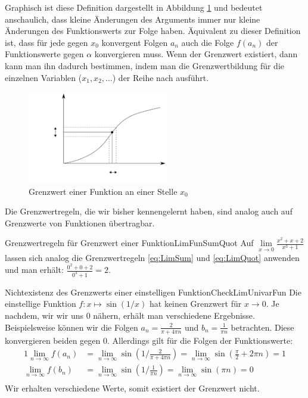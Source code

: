Graphisch ist diese Definition dargestellt in Abbildung \ref{fig:LimFun} und bedeutet anschaulich, dass kleine Änderungen des Arguments immer nur kleine Änderungen des Funktionswerts zur Folge haben. Äquivalent zu dieser Definition ist, dass für jede gegen $x_0$ konvergent Folgen $a_n$ auch die Folge $f(a_n)$ der Funktionswerte gegen $\alpha$ konvergieren muss. Wenn der Grenzwert existiert, dann kann man ihn dadurch bestimmen, indem man die Grenzwertbildung für die einzelnen Variablen ($x_1, x_2, \dots$) der Reihe nach ausführt.

\begin{figure}
    \centering
    \includegraphics[width=0.55\textwidth]{./svg/definition-convergence-point}
    \caption[Grenzwert einer Funktion]{Grenzwert einer Funktion an einer Stelle $x_0$}
    \label{fig:LimFun}
\end{figure}

Die Grenzwertregeln, die wir bisher kennengelernt haben, sind analog auch auf Grenzwerte von Funktionen übertragbar.

\begin{example}{Grenzwertregeln für Grenzwert einer Funktion}{LimFunSumQuot}
    Auf $\lim\limits_{x\to 0} \frac{x^2+x+2}{x^3+1}$ lassen sich analog die Grenzwertregeln \ref{eq:LimSum} und \ref{eq:LimQuot} anwenden und man erhält: $\frac{0^2+0+2}{0^3+1} = 2$.
\end{example}

\begin{example}{Nichtexistenz des Grenzwerts einer einstelligen Funktion}{CheckLimUnivarFun}
    Die einstellige Funktion $f: x \mapsto \sin(1/x)$ hat keinen Grenzwert für $x \to 0$. Je nachdem, wir wir uns $0$ nähern, erhält man verschiedene Ergebnisse. Beispielsweise können wir die Folgen $a_n = \frac{2}{\pi+4\pi n}$ und $b_n = \frac{1}{\pi n}$ betrachten. Diese konvergieren beiden gegen $0$. Allerdings gilt für die Folgen der Funktionswerte:
    \begin{alignat}{1}
       \lim\limits_{n\to\infty} f(a_n) &= \lim\limits_{n\to\infty} \sin\left(1 / \frac{2}{\pi+4\pi n}\right) = \lim\limits_{n\to\infty} \sin(\frac{\pi}{2} + 2\pi n) = 1 \\
       \lim\limits_{n\to\infty} f(b_n) &= \lim\limits_{n\to\infty} \sin\left(1 / \frac{1}{\pi n}\right) = \lim\limits_{n\to\infty} \sin(\pi n) = 0 \\
    \end{alignat}
    Wir erhalten verschiedene Werte, somit existiert der Grenzwert nicht.
\end{example}


